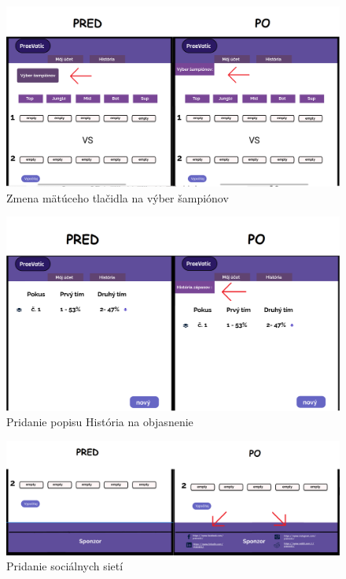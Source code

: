 \begin{figure}[h!]
	
	\includegraphics[width=.9\textwidth]{figures/2}
	
	\centering
	
	\caption{Zmena mätúceho tlačidla na výber šampiónov\label{2}}
	
\end{figure}



\begin{figure}[h!]
	
	\includegraphics[width=.9\textwidth]{figures/3}
	
	\centering
	
	\caption{ Pridanie popisu História na objasnenie \label{3}}
	
\end{figure}



\begin{figure}[h!]
	
	\includegraphics[width=.9\textwidth]{figures/4}
	
	\centering
	
	\caption{ Pridanie sociálnych sietí \label{4}}
	
\end{figure}





